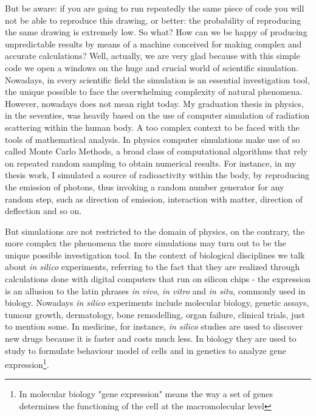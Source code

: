 But be aware: if you are going to run repeatedly the same piece of code you will not be able to reproduce this drawing, or better: the probability of reproducing the same drawing is extremely low. So what? How can we be happy of producing unpredictable results by means of a machine conceived for making complex and accurate calculations? Well, actually, we are very glad because with this simple code we open a windows on the huge and crucial world of scientific simulation. Nowadays, in every scientific field the simulation is an essential investigation tool, the unique possible to face the overwhelming complexity of natural phenomena. However, nowadays does not mean right today. My graduation thesis in physics, in the seventies, was heavily based on the use of computer simulation of radiation scattering within the human body. A too complex context to be faced with the tools of mathematical analysis. In physics computer simulations make use of so called Monte Carlo Methods, a broad class of computational algorithms that rely on repeated random sampling to obtain numerical results. For instance, in my thesis work, I simulated a source of radioactivity within the body, by reproducing the emission of photons, thus invoking a random number generator for any random step, such as direction of emission, interaction with matter, direction of deflection and so on. 

But simulations are not restricted to the domain of physics, on the contrary, the more complex the phenomena the more simulations may turn out to be the unique possible investigation tool. In the context of biological disciplines we talk about \textit{in silico} experiments, referring to the fact that they are realized through calculations done with digital computers that run on silicon chips - the expression is an allusion to the latin phrases \textit{in vivo}, \textit{in vitro} and \textit{in situ}, commonly used in biology. Nowadays \textit{in silico} experiments include molecular biology, genetic assays, tumour growth, dermatology, bone remodelling, organ failure, clinical trials, just to mention some. In medicine, for instance, \textit{in silico} studies are used to discover new drugs because it is faster and costs much less. In biology they are used to study to formulate behaviour model of cells and in genetics to analyze gene expression\footnote{In molecular biology "gene expression" means the way a set of genes determines  the functioning of the cell at the macromolecular level}. 

